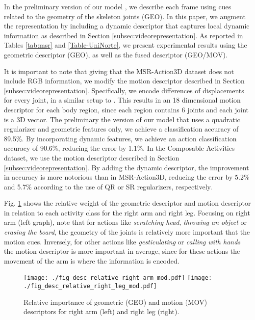 In the preliminary version of our model \cite{Lillo2014},
we describe each frame using cues related to the geometry of the skeleton joints (GEO).
In this paper, we augment the representation by including a dynamic descriptor
that captures local dynamic information
as described in Section \ref{subsec:videorepresentation}. As reported in Tables \ref{tab:msr} and 
\ref{Table-UniNorte}, we present experimental results using the geometric descriptor (GEO), as well 
as the fused descriptor (GEO/MOV).

It is important to note that giving that the MSR-Action3D dataset does not include RGB information,
we modify the motion descriptor described in Section 
\ref{subsec:videorepresentation}. Specifically,
we encode differences of displacements for every joint, in a similar setup to
\cite{WangCVPR2011}.
This results in an 18 dimensional motion descriptor for each body region,
since each region contains 6 joints and each joint is a 3D vector.
The preliminary the version of our model \cite{Lillo2014} that uses
a quadratic regularizer and geometric features only,
we achieve a classification accuracy of 89.5\%.
By incorporating dynamic features,
we achieve an action classification accuracy of 90.6\%, reducing the error by 1.1\%. In the 
Composable Activities dataset, we use the motion descriptor described in Section 
\ref{subsec:videorepresentation}.
By adding the dynamic descriptor, the
improvement in accuracy is more notorious than in MSR-Action3D,
reducing the error by 5.2\% and 5.7\% according to the use of QR or SR regularizers, respectively.

Fig. \ref{fig:geo_mov_importance} shows the relative weight
of the geometric descriptor and motion descriptor in relation to each activity class
for the right arm and right leg. Focusing on right arm (left graph), note that
for actions like \emph{scratching head}, \emph{throwing an object} or
\emph{erasing the board}, the geometry of the joints is relatively more
important that the motion cues. Inversely, for other actions like
\emph{gesticulating} or \emph{calling with hands} the motion descriptor is more
important in average, since for these actions the movement of the arm is where
the information is encoded. 

\begin{figure}[tb]
\begin{center}
\texttt{[image: ./fig\_desc\_relative\_right\_arm\_mod.pdf]}
\texttt{[image: ./fig\_desc\_relative\_right\_leg\_mod.pdf]}
\end{center}
\caption{Relative importance of geometric (GEO) and motion (MOV) descriptors for right arm (left) and right leg (right).}
\label{fig:geo_mov_importance}
\end{figure}

